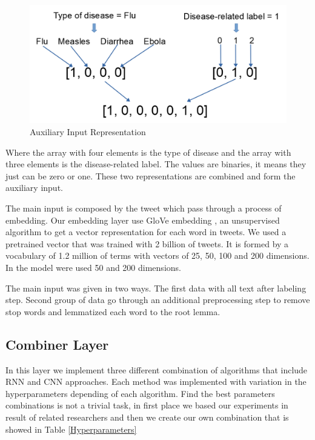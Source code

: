 \documentclass[12pt]{report}
\begin{document}
\begin{figure}[H]	
	\centering
	\includegraphics[width=130mm, scale = 1]{images/10_categorical.png}	
	\caption{Auxiliary Input Representation}	
	\label{figure:categorical}
\end{figure}

\noindent Where the array with four elements is the type of disease and the array with three elements is the disease-related label. The values are binaries, it means they just can be zero or one. These two representations are combined and form the auxiliary input.

The main input is composed by the tweet which pass through a process of embedding. Our embedding layer use GloVe embedding \cite{pennington2014}, an unsupervised algorithm to get a vector representation for each word in tweets. We used a pretrained vector that was trained with 2 billion of tweets. It is formed by a vocabulary of 1.2 million of terms with vectors of 25, 50, 100 and 200 dimensions. In the model were used 50 and 200 dimensions.

The main input was given in two ways. The first data with all text after labeling step. Second group of data go through an additional preprocessing step to remove stop words and lemmatized each word to the root lemma.

\subsection{Combiner Layer}

In this layer we implement three different combination of algorithms that include RNN and CNN approaches.  Each method was implemented with variation in the hyperparameters depending of each algorithm.
Find the best parameters combinations is not a trivial task, in first place we based our experiments in result of related researchers and then we create our own combination that is showed in Table \ref{Hyperparameters}
\end{document}
